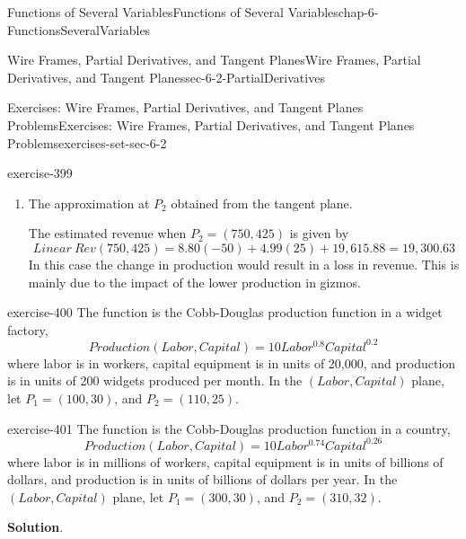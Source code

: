 \documentclass[oneside,10pt,]{book}
\numberwithin{equation}{section}
\begin{document}
\begin{chapterptx}{Functions of Several Variables}{}{Functions of Several Variables}{}{}{chap-6-FunctionsSeveralVariables}
\begin{sectionptx}{Wire Frames, Partial Derivatives, and Tangent Planes}{}{Wire Frames, Partial Derivatives, and Tangent Planes}{}{}{sec-6-2-PartialDerivatives}
\begin{exercises-subsection-numberless}{Exercises: Wire Frames, Partial Derivatives, and Tangent Planes Problems}{}{Exercises: Wire Frames, Partial Derivatives, and Tangent Planes Problems}{}{}{exercises-set-sec-6-2}
\begin{exercisegroup}
\begin{divisionexerciseeg}{5}{}{}{exercise-399}
\begin{enumerate}[label=(\alph*)]
\begin{equation*}
+Rev(QG_0,QW_0 ).
\end{equation*}
\hypertarget{p-2281}{}%
We need to find \(Rev(800,400)\). Using Wolfram Alpha (or calculator) we get%
%
\begin{equation*}
Rev(800,400)=19,615.88
\end{equation*}
%
\begin{equation*}
Linear\ Rev(QG,QW)=8.80(QG-800)+4.99(QW-400)+19,615.88.
\end{equation*}
\item\hypertarget{li-631}{}\hypertarget{p-2282}{}%
The approximation at \(P_2\) obtained from the tangent plane.%
\par
\hypertarget{p-2283}{}%
The estimated revenue when \(P_2=(750,425)\) is given by%
%
\begin{equation*}
Linear\ Rev(750,425)=8.80(-50)+4.99(25)+19,615.88=19,300.63
\end{equation*}
\hypertarget{p-2284}{}%
In this case the change in production would result in a loss in revenue. This is mainly due to the impact of the lower production in gizmos.%
\end{enumerate}
\end{divisionexerciseeg}%
\begin{divisionexerciseeg}{6}{}{}{exercise-400}%
\hypertarget{p-2285}{}%
The function is the Cobb-Douglas production function in a widget factory,%
%
\begin{equation*}
Production(Labor,Capital)=10 Labor^{0.8}  Capital^{0.2}
\end{equation*}
\hypertarget{p-2286}{}%
where labor is in workers, capital equipment is in units of \textdollar{}20,000, and production is in units of 200 widgets produced per month.  In the \((Labor,Capital)\) plane, let \(P_1=(100,30)\), and \(P_2=(110,25)\).%
\end{divisionexerciseeg}%
\begin{divisionexerciseeg}{7}{}{}{exercise-401}%
\hypertarget{p-2287}{}%
The function is the Cobb-Douglas production function in a country,%
%
\begin{equation*}
Production(Labor,Capital)=10 Labor^{0.74}Capital^{0.26}
\end{equation*}
\hypertarget{p-2288}{}%
where labor is in millions of workers, capital equipment is in units of billions of dollars, and production is in units of billions of dollars per year.  In the \((Labor,Capital)\) plane, let \(P_1=(300,30)\), and \(P_2=(310,32)\).%
\par\smallskip%
\noindent\textbf{Solution}.\hypertarget{solution-202}{}\quad%

\end{divisionexerciseeg}
\end{exercisegroup}
\end{exercises-subsection-numberless}
\end{sectionptx}
\end{chapterptx}
\end{document}
